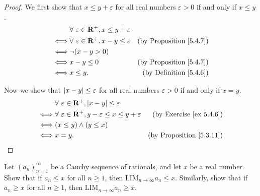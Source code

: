 \begin{proof}
    We first show that \(x \leq y + \varepsilon\) for all real numbers \(\varepsilon > 0\) if and only if \(x \leq y\).
    \begin{align*}
             & \forall\ \varepsilon \in \mathbf{R}^+, x \leq y + \varepsilon                                       \\
        \iff & \forall\ \varepsilon \in \mathbf{R}^+, x - y \leq \varepsilon & \text{(by Proposition \ref{5.4.7})} \\
        \iff & \lnot (x - y > 0)                                                                                   \\
        \iff & x - y \leq 0                                                  & \text{(by Proposition \ref{5.4.7})} \\
        \iff & x \leq y.                                                     & \text{(by Definition \ref{5.4.6})}
    \end{align*}

    Now we show that \(\abs*{x - y} \leq \varepsilon\) for all real numbers \(\varepsilon > 0\) if and only if \(x = y\).
    \begin{align*}
             & \forall\ \varepsilon \in \mathbf{R}^+, \abs*{x - y} \leq \varepsilon                                                      \\
        \iff & \forall\ \varepsilon \in \mathbf{R}^+, y - \varepsilon \leq x \leq y + \varepsilon & \text{(by Exercise \ref{ex 5.4.6})}  \\
        \iff & (x \leq y) \land (y \leq x)                                                                                               \\
        \iff & x = y.                                                                             & \text{(by Proposition \ref{5.3.11})}
    \end{align*}
\end{proof}

\begin{exercise}\label{ex 5.4.8}
    Let \((a_n)_{n = 1}^{\infty}\) be a Cauchy sequence of rationals, and let \(x\) be a real number.
    Show that if \(a_n \leq x\) for all \(n \geq 1\), then \(\text{LIM}_{n \to \infty} a_n \leq x\).
    Similarly, show that if \(a_n \geq x\) for all \(n \geq 1\), then \(\text{LIM}_{n \to \infty} a_n \geq x\).
\end{exercise}

